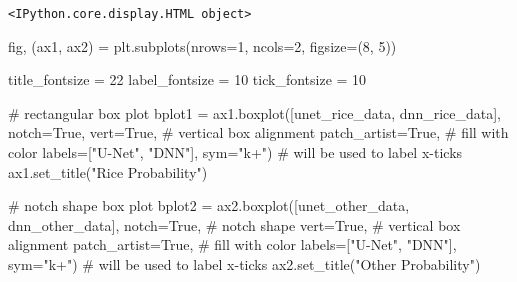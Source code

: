\documentclass[
  letterpaper,
  DIV=11,
  numbers=noendperiod]{scrreprt}
\newenvironment{Shaded}{\begin{snugshade}}{\end{snugshade}}
\newcommand{\CommentTok}[1]{\textcolor[rgb]{0.37,0.37,0.37}{#1}}
\newcommand{\DecValTok}[1]{\textcolor[rgb]{0.68,0.00,0.00}{#1}}
\newcommand{\NormalTok}[1]{\textcolor[rgb]{0.00,0.23,0.31}{#1}}
\newcommand{\OperatorTok}[1]{\textcolor[rgb]{0.37,0.37,0.37}{#1}}
\newcommand{\StringTok}[1]{\textcolor[rgb]{0.13,0.47,0.30}{#1}}
\newcommand{\VariableTok}[1]{\textcolor[rgb]{0.07,0.07,0.07}{#1}}
\begin{document}
\begin{verbatim}
<IPython.core.display.HTML object>
\end{verbatim}

\begin{Shaded}
\begin{Highlighting}[]
\NormalTok{fig, (ax1, ax2) }\OperatorTok{=}\NormalTok{ plt.subplots(nrows}\OperatorTok{=}\DecValTok{1}\NormalTok{, ncols}\OperatorTok{=}\DecValTok{2}\NormalTok{, figsize}\OperatorTok{=}\NormalTok{(}\DecValTok{8}\NormalTok{, }\DecValTok{5}\NormalTok{))}

\NormalTok{title\_fontsize }\OperatorTok{=} \DecValTok{22}
\NormalTok{label\_fontsize }\OperatorTok{=} \DecValTok{10}
\NormalTok{tick\_fontsize }\OperatorTok{=} \DecValTok{10}

\CommentTok{\# rectangular box plot}
\NormalTok{bplot1 }\OperatorTok{=}\NormalTok{ ax1.boxplot([unet\_rice\_data, dnn\_rice\_data],}
\NormalTok{                     notch}\OperatorTok{=}\VariableTok{True}\NormalTok{,}
\NormalTok{                     vert}\OperatorTok{=}\VariableTok{True}\NormalTok{,  }\CommentTok{\# vertical box alignment}
\NormalTok{                     patch\_artist}\OperatorTok{=}\VariableTok{True}\NormalTok{,  }\CommentTok{\# fill with color}
\NormalTok{                     labels}\OperatorTok{=}\NormalTok{[}\StringTok{"U{-}Net"}\NormalTok{, }\StringTok{"DNN"}\NormalTok{],}
\NormalTok{                     sym}\OperatorTok{=}\StringTok{"k+"}\NormalTok{)  }\CommentTok{\# will be used to label x{-}ticks}
\NormalTok{ax1.set\_title(}\StringTok{"Rice Probability"}\NormalTok{)}

\CommentTok{\# notch shape box plot}
\NormalTok{bplot2 }\OperatorTok{=}\NormalTok{ ax2.boxplot([unet\_other\_data, dnn\_other\_data],}
\NormalTok{                     notch}\OperatorTok{=}\VariableTok{True}\NormalTok{,  }\CommentTok{\# notch shape}
\NormalTok{                     vert}\OperatorTok{=}\VariableTok{True}\NormalTok{,  }\CommentTok{\# vertical box alignment}
\NormalTok{                     patch\_artist}\OperatorTok{=}\VariableTok{True}\NormalTok{,  }\CommentTok{\# fill with color}
\NormalTok{                     labels}\OperatorTok{=}\NormalTok{[}\StringTok{"U{-}Net"}\NormalTok{, }\StringTok{"DNN"}\NormalTok{],}
\NormalTok{                     sym}\OperatorTok{=}\StringTok{"k+"}\NormalTok{)  }\CommentTok{\# will be used to label x{-}ticks}
\NormalTok{ax2.set\_title(}\StringTok{"Other Probability"}\NormalTok{)}
\end{Highlighting}
\end{Shaded}
\end{document}
